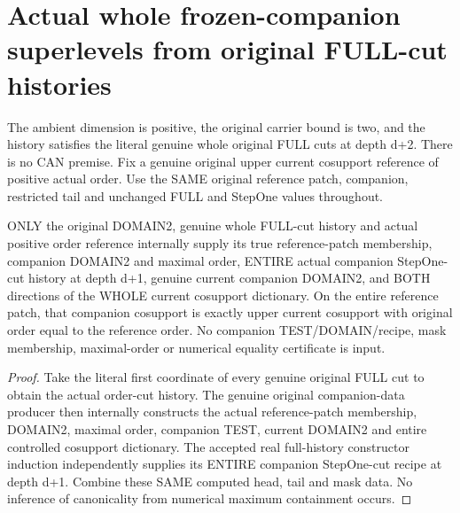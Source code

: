 \section{Actual whole frozen-companion superlevels from original FULL-cut histories}

The ambient dimension is positive, the original carrier bound is two, and
the history satisfies the literal genuine whole original FULL cuts at depth
d+2. There is no CAN premise. Fix a genuine original upper current cosupport
reference of positive actual order. Use the SAME original reference patch,
companion, restricted tail and unchanged FULL and StepOne values throughout.

\begin{theorem}
\label{hir:original-full-cut-frozen-companion-data}
\leanok
ONLY the original DOMAIN2, genuine whole FULL-cut history and actual positive
order reference internally supply its true reference-patch membership,
companion DOMAIN2 and maximal order, ENTIRE actual companion StepOne-cut
history at depth d+1, genuine current companion DOMAIN2, and BOTH directions
of the WHOLE current cosupport dictionary. On the entire reference patch,
that companion cosupport is exactly upper current cosupport with original
order equal to the reference order. No companion TEST/DOMAIN/recipe, mask
membership, maximal-order or numerical equality certificate is input.
\end{theorem}
\begin{proof}
Take the literal first coordinate of every genuine original FULL cut to
obtain the actual order-cut history. The genuine original companion-data
producer then internally constructs the actual reference-patch membership,
DOMAIN2, maximal order, companion TEST, current DOMAIN2 and entire controlled
cosupport dictionary. The accepted real full-history constructor induction
independently supplies its ENTIRE companion StepOne-cut recipe at depth d+1.
Combine these SAME computed head, tail and mask data. No inference of
canonicality from numerical maximum containment occurs.
\end{proof}

